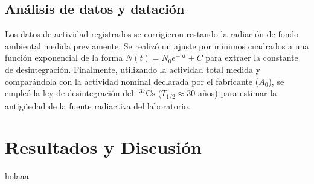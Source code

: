 \documentclass[9pt,a4paper,twocolumn,twoside]{rho-class/rho}
\begin{document}
\subsection{Análisis de datos y datación}
Los datos de actividad registrados se corrigieron restando la radiación de fondo ambiental medida previamente. %
Se realizó un ajuste por mínimos cuadrados a una función exponencial de la forma $N(t) = N_0 e^{-\lambda t} + C$ para extraer la constante de desintegración. %
Finalmente, utilizando la actividad total medida y comparándola con la actividad nominal declarada por el fabricante ($A_0$), se empleó la ley de desintegración del $^{137}\text{Cs}$ ($T_{1/2} \approx 30$ años) para estimar la antigüedad de la fuente radiactiva del laboratorio. %

\section{Resultados y Discusión}
holaaa
\end{document}
